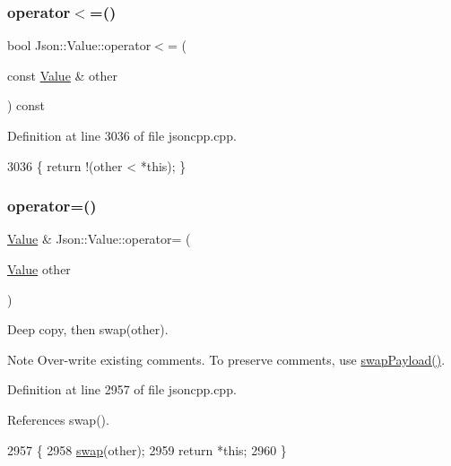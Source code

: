 \subsubsection{\texorpdfstring{operator$<$=()}{operator<=()}}
{\footnotesize\ttfamily bool Json\+::\+Value\+::operator$<$= (\begin{DoxyParamCaption}\item[{const \hyperlink{class_json_1_1_value}{Value} \&}]{other }\end{DoxyParamCaption}) const}



Definition at line 3036 of file jsoncpp.\+cpp.


\begin{DoxyCode}
3036 \{ \textcolor{keywordflow}{return} !(other < *\textcolor{keyword}{this}); \}
\end{DoxyCode}
\mbox{\label{class_json_1_1_value_a795acb28772da4c5d85ae8f4af36c69f}} 
\subsubsection{\texorpdfstring{operator=()}{operator=()}}
{\footnotesize\ttfamily \hyperlink{class_json_1_1_value}{Value} \& Json\+::\+Value\+::operator= (\begin{DoxyParamCaption}\item[{\hyperlink{class_json_1_1_value}{Value}}]{other }\end{DoxyParamCaption})}

Deep copy, then swap(other). \begin{DoxyNote}{Note}
Over-\/write existing comments. To preserve comments, use \hyperlink{class_json_1_1_value_a5263476047f20e2fc6de470e4de34fe5}{swap\+Payload()}. 
\end{DoxyNote}


Definition at line 2957 of file jsoncpp.\+cpp.



References swap().


\begin{DoxyCode}
2957                                    \{
2958   \hyperlink{class_json_1_1_value_aab841120d78e296e1bc06a373345e822}{swap}(other);
2959   \textcolor{keywordflow}{return} *\textcolor{keyword}{this};
2960 \}
\end{DoxyCode}
\mbox{\label{class_json_1_1_value_a16f9250e30d5c4505cd11137c564a764}} 
